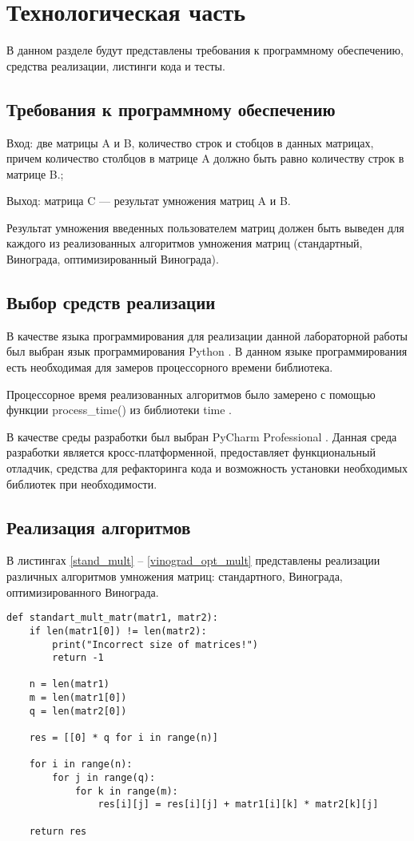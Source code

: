 \chapter{Технологическая часть}

В данном разделе будут представлены требования к программному обеспечению, средства реализации, листинги кода и тесты.

\section{Требования к программному обеспечению}
Вход: две матрицы A и B, количество строк и стобцов в данных матрицах, причем количество столбцов в матрице A должно быть равно количеству строк в матрице B.;

Выход: матрица C --- результат умножения матриц A и B.

Результат умножения введенных пользователем матриц должен быть выведен для каждого из реализованных алгоритмов умножения матриц (стандартный, Винограда, оптимизированный Винограда).

\section{Выбор средств реализации}

В качестве языка программирования для реализации данной лабораторной работы был выбран язык программирования Python  \cite{PythonBook}. В данном языке программирования есть необходимая для замеров процессорного времени библиотека.

Процессорное время реализованных алгоритмов было замерено с помощью функции process\_time() из библиотеки time \cite{process_time_text}.

В качестве среды разработки был выбран PyCharm Professional \cite{pycharm}. Данная среда разработки является кросс-платформенной, предоставляет функциональный отладчик, средства для рефакторинга кода и возможность установки необходимых библиотек при необходимости.

\section{Реализация алгоритмов}

В листингах \ref{stand_mult} -- \ref{vinograd_opt_mult} представлены реализации различных алгоритмов умножения матриц: стандартного, Винограда, оптимизированного Винограда.

\begin{lstlisting}[caption=Реализация стандартного алгоритма умножения матриц, 
    label={stand_mult}]
def standart_mult_matr(matr1, matr2):
    if len(matr1[0]) != len(matr2):
        print("Incorrect size of matrices!")
        return -1

    n = len(matr1)
    m = len(matr1[0])
    q = len(matr2[0])

    res = [[0] * q for i in range(n)]

    for i in range(n):
        for j in range(q):
            for k in range(m):
                res[i][j] = res[i][j] + matr1[i][k] * matr2[k][j]

    return res
\end{lstlisting}


